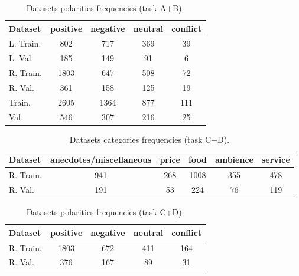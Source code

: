 \documentclass[11pt,a4paper]{article}
\begin{document}
	\begin{table}[H]
		\centering
		\begin{tabular}{@{}lcccc@{}}
			\toprule
			\textbf{Dataset} & positive & negative & neutral & conflict \\ \midrule
			L. Train.        & 802      & 717      & 369     & 39       \\
			L. Val.          & 185      & 149      & 91      & 6        \\
			R. Train.        & 1803     & 647      & 508     & 72       \\
			R. Val.          & 361      & 158      & 125     & 19       \\ \midrule
			Train.           & 2605     & 1364     & 877     & 111      \\
			Val.             & 546      & 307      & 216     & 25       \\ \bottomrule
		\end{tabular}
		\caption{Datasets polarities frequencies (task A+B).}
		\label{tab:targets}
	\end{table}
	
	\begin{table}[H]
		\centering
		\begin{tabular}{@{}lccccc@{}}
			\toprule
			\textbf{Dataset} & anecdotes/miscellaneous & price & food & ambience & service \\ \midrule
			R. Train.        & 941                     & 268   & 1008 & 355      & 478     \\
			R. Val.          & 191                     & 53    & 224  & 76       & 119     \\ \bottomrule
		\end{tabular}
		\caption{Datasets categories frequencies (task C+D).}
		\label{tab:targets}
	\end{table}
	
	\begin{table}[H]
		\centering
		\begin{tabular}{@{}lcccc@{}}
			\toprule
			\textbf{Dataset} & positive & negative & neutral & conflict \\ \midrule
			R. Train.        & 1803     & 672      & 411     & 164      \\
			R. Val.          & 376      & 167      & 89      & 31       \\ \bottomrule
		\end{tabular}
		\caption{Datasets polarities frequencies (task C+D).}
		\label{tab:targets}
	\end{table}
	
	
	
	
	
	
	
\end{document}
